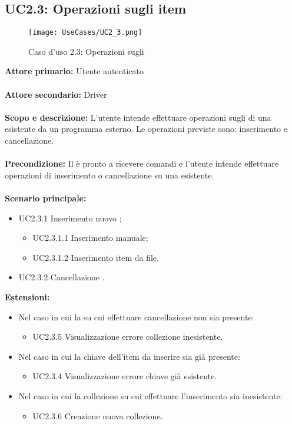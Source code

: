 \documentclass{scalatekids-article}
\begin{document}
\subsection{UC2.3: Operazioni sugli item}
\begin{figure}[H]
  \begin{center}
    \texttt{[image: UseCases/UC2\_3.png]}
    \caption*{Caso d'uso 2.3: Operazioni sugli }
  \end{center}
\end{figure}
\textbf{Attore primario:} Utente autenticato\\ \\
\textbf{Attore secondario:} Driver\\ \\
\textbf{Scopo e descrizione:} L'utente intende effettuare operazioni sugli  di una  esistente da un programma  esterno. Le operazioni previste sono:
inserimento e cancellazione.\\ \\
\textbf{Precondizione:} Il  è pronto a ricevere comandi e l'utente intende effettuare operazioni di inserimento o cancellazione su una  esistente.\\ \\
\textbf{Scenario principale:}
\begin{itemize}
  \item UC2.3.1 Inserimento nuovo ;
  \begin{itemize}
    \item UC2.3.1.1 Inserimento  manuale;
    \item UC2.3.1.2 Inserimento  item da file.
  \end{itemize}
  \item UC2.3.2 Cancellazione .
\end{itemize}
\textbf{Estensioni:}
\begin{itemize} %
  \item Nel caso in cui la  su cui effettuare cancellazione non sia presente:
  \begin{itemize}
    \item UC2.3.5 Visualizzazione errore collezione inesistente.
  \end{itemize}
  \item Nel caso in cui la chiave dell'item da inserire sia già presente:
  \begin{itemize}
    \item UC2.3.4 Visualizzazione errore chiave già esistente.
  \end{itemize}
  \item Nel caso in cui la collezione su cui effettuare l'inserimento sia inesistente:
  \begin{itemize}
    \item UC2.3.6 Creazione nuova collezione.
  \end{itemize}
\end{itemize}
\end{document}
